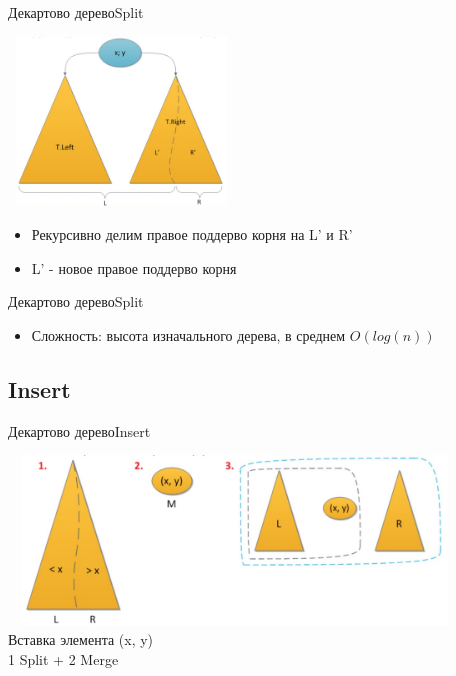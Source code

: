 \documentclass[10pt]{beamer}
\begin{document}
\begin{frame}[fragile]{Декартово дерево}{Split}
\begin{center}
\includegraphics[width=6cm, height=4.5cm]{Term_1/Source/Pirctures/treap_split_step.jpg}
\end{center}
\begin{itemize}
    \item Рекурсивно делим правое поддерво корня на L' и R'
    \item L' - новое правое поддерво корня
\end{itemize}
\end{frame}

\begin{frame}[fragile]{Декартово дерево}{Split}
\begin{itemize}
    \item Сложность: высота изначального дерева, в среднем $O(log(n))$
\end{itemize}
\end{frame}

\subsection{Insert}
\begin{frame}[fragile]{Декартово дерево}{Insert}
\begin{center}
\includegraphics[width=12cm, height=4.5cm]{Term_1/Source/Pirctures/treap_insert.jpg}\\
Вставка элемента  (x, y)\\
1 Split + 2 Merge
\end{center}
\end{frame}
\end{document}
